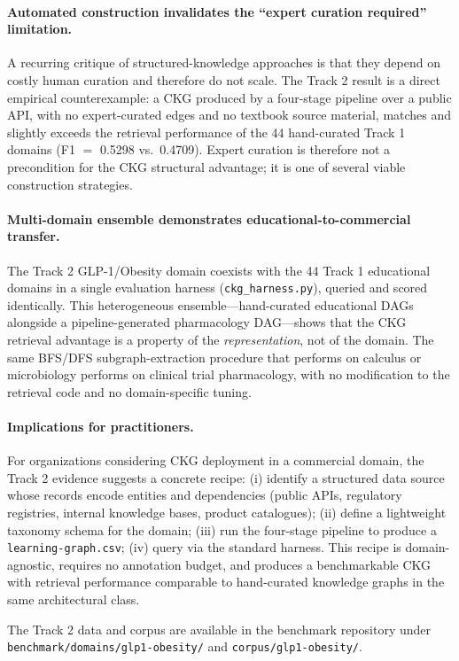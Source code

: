 \paragraph{Automated construction invalidates the ``expert curation required'' limitation.}
A recurring critique of structured-knowledge approaches is that they
depend on costly human curation and therefore do not scale. The Track 2
result is a direct empirical counterexample: a CKG produced by a
four-stage pipeline over a public API, with no expert-curated edges
and no textbook source material, matches and slightly exceeds the
retrieval performance of the 44 hand-curated Track 1 domains
(F1 $=$ 0.5298 vs.\ 0.4709). Expert curation is therefore not a
precondition for the CKG structural advantage; it is one of several
viable construction strategies.

\paragraph{Multi-domain ensemble demonstrates educational-to-commercial transfer.}
The Track 2 GLP-1/Obesity domain coexists with the 44 Track 1
educational domains in a single evaluation harness (\texttt{ckg\_harness.py}),
queried and scored identically. This heterogeneous ensemble---hand-curated
educational DAGs alongside a pipeline-generated pharmacology DAG---shows
that the CKG retrieval advantage is a property of the \emph{representation},
not of the domain. The same BFS/DFS subgraph-extraction procedure that
performs on calculus or microbiology performs on clinical trial
pharmacology, with no modification to the retrieval code and no
domain-specific tuning.

\paragraph{Implications for practitioners.}
For organizations considering CKG deployment in a commercial domain, the
Track 2 evidence suggests a concrete recipe: (i) identify a structured
data source whose records encode entities and dependencies (public APIs,
regulatory registries, internal knowledge bases, product catalogues);
(ii) define a lightweight taxonomy schema for the domain;
(iii) run the four-stage pipeline to produce a \texttt{learning-graph.csv};
(iv) query via the standard harness. This recipe is domain-agnostic,
requires no annotation budget, and produces a benchmarkable CKG with
retrieval performance comparable to hand-curated knowledge graphs in
the same architectural class.

The Track 2 data and corpus are available in the benchmark repository
under \texttt{benchmark/domains/glp1-obesity/} and
\texttt{corpus/glp1-obesity/}.
